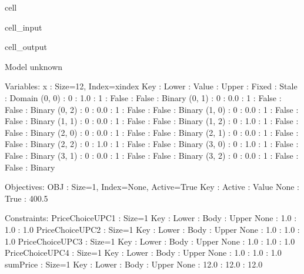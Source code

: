 \documentclass[letterpaper,10pt,english]{jupyterBook}
\begin{document}
\begin{sphinxuseclass}{cell}\begin{sphinxVerbatimInput}

\begin{sphinxuseclass}{cell_input}
\begin{sphinxVerbatim}[commandchars=\\\{\}]
\end{sphinxVerbatim}

\end{sphinxuseclass}\end{sphinxVerbatimInput}
\begin{sphinxVerbatimOutput}

\begin{sphinxuseclass}{cell_output}
\begin{sphinxVerbatim}[commandchars=\\\{\}]
Model unknown

  Variables:
    x : Size=12, Index=x\PYGZus{}index
        Key    : Lower : Value : Upper : Fixed : Stale : Domain
        (0, 0) :     0 :   1.0 :     1 : False : False : Binary
        (0, 1) :     0 :   0.0 :     1 : False : False : Binary
        (0, 2) :     0 :   0.0 :     1 : False : False : Binary
        (1, 0) :     0 :   0.0 :     1 : False : False : Binary
        (1, 1) :     0 :   0.0 :     1 : False : False : Binary
        (1, 2) :     0 :   1.0 :     1 : False : False : Binary
        (2, 0) :     0 :   0.0 :     1 : False : False : Binary
        (2, 1) :     0 :   0.0 :     1 : False : False : Binary
        (2, 2) :     0 :   1.0 :     1 : False : False : Binary
        (3, 0) :     0 :   1.0 :     1 : False : False : Binary
        (3, 1) :     0 :   0.0 :     1 : False : False : Binary
        (3, 2) :     0 :   0.0 :     1 : False : False : Binary

  Objectives:
    OBJ : Size=1, Index=None, Active=True
        Key  : Active : Value
        None :   True : 400.5

  Constraints:
    PriceChoiceUPC1 : Size=1
        Key  : Lower : Body : Upper
        None :   1.0 :  1.0 :   1.0
    PriceChoiceUPC2 : Size=1
        Key  : Lower : Body : Upper
        None :   1.0 :  1.0 :   1.0
    PriceChoiceUPC3 : Size=1
        Key  : Lower : Body : Upper
        None :   1.0 :  1.0 :   1.0
    PriceChoiceUPC4 : Size=1
        Key  : Lower : Body : Upper
        None :   1.0 :  1.0 :   1.0
    sumPrice : Size=1
        Key  : Lower : Body : Upper
        None :  12.0 : 12.0 :  12.0
\end{sphinxVerbatim}

\end{sphinxuseclass}\end{sphinxVerbatimOutput}

\end{sphinxuseclass}
\sphinxstepscope
\end{document}
